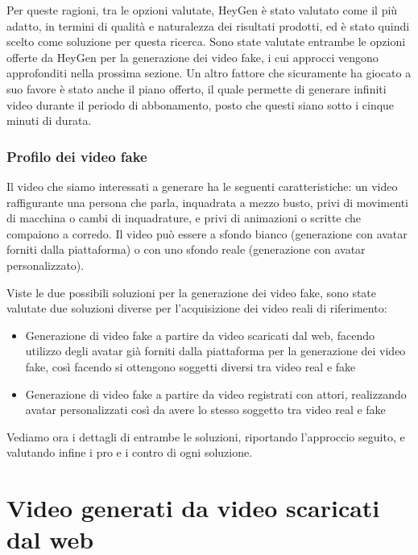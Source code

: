 Per queste ragioni, tra le opzioni valutate, HeyGen è stato valutato come il più adatto, in termini di qualità e naturalezza dei risultati prodotti, ed è stato quindi scelto come soluzione per questa ricerca. Sono state valutate entrambe le opzioni offerte da HeyGen per la generazione dei video fake, i cui approcci vengono approfonditi nella prossima sezione. Un altro fattore che sicuramente ha giocato a suo favore è stato anche il piano offerto, il quale permette di generare infiniti video durante il periodo di abbonamento, posto che questi siano sotto i cinque minuti di durata.

\subsubsection{Profilo dei video fake}
 Il video che siamo interessati a generare ha le seguenti caratteristiche: un video raffigurante una persona che parla, inquadrata a mezzo busto, privi di movimenti di macchina o cambi di inquadrature, e privi di animazioni o scritte che compaiono a corredo. Il video può essere a sfondo bianco (generazione con avatar forniti dalla piattaforma) o con uno sfondo reale (generazione con avatar personalizzato).

Viste le due possibili soluzioni per la generazione dei video fake, sono state valutate due soluzioni diverse per l'acquisizione dei video reali di riferimento:
\begin{itemize}
    \item Generazione di video fake a partire da video scaricati dal web, facendo utilizzo degli avatar già forniti dalla piattaforma per la generazione dei video fake, così facendo si ottengono soggetti diversi tra video real e fake
    \item Generazione di video fake a partire da video registrati con attori, realizzando avatar personalizzati così da avere lo stesso soggetto tra video real e fake
\end{itemize}

Vediamo ora i dettagli di entrambe le soluzioni, riportando l'approccio seguito, e valutando infine i pro e i contro di ogni soluzione.

\section{Video generati da video scaricati dal web}
\label{sec:generati_dal_web}

